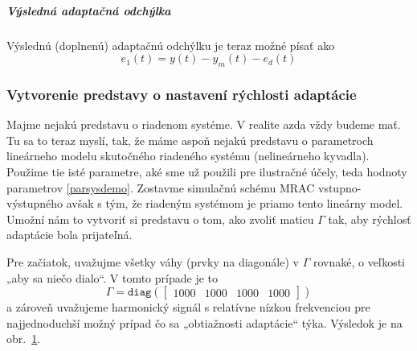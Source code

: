 \documentclass[a4paper, 10pt, ]{article}
\begin{document}
\subparagraph{Výsledná adaptačná odchýlka}

Výslednú (doplnenú) adaptačnú odchýlku je teraz možné písať ako
\begin{equation}
	e_1(t) = y(t) - y_m(t) - e_d(t)
\end{equation}















\subsubsection{Vytvorenie predstavy o nastavení rýchlosti adaptácie}

Majme nejakú predstavu o riadenom systéme. V realite azda vždy budeme mať. Tu sa to teraz myslí, tak, že máme aspoň nejakú predstavu o parametroch lineárneho modelu skutočného riadeného systému (nelineárneho kyvadla). Použime tie isté parametre, aké sme už použili pre ilustračné účely, teda hodnoty parametrov \eqref{parsysdemo}. Zostavme simulačnú schému MRAC vstupno-výstupného avšak s tým, že riadeným systémom je priamo tento lineárny model. Umožní nám to vytvoriť si predstavu o tom, ako zvoliť maticu $\Gamma$ tak, aby rýchlosť adaptácie bola prijateľná.

Pre začiatok, uvažujme všetky váhy (prvky na diagonále) v $\Gamma$ rovnaké, o veľkosti „aby sa niečo dialo“. V tomto prípade je to
\begin{equation*}
    \Gamma = \texttt{diag}
    \left(
    \begin{bmatrix}
        1000 & 1000 & 1000 & 1000
    \end{bmatrix}
    \right)
\end{equation*}
a zároveň uvažujeme harmonický signál s relatívne nízkou frekvenciou pre najjednoduchší možný prípad čo sa „obtiažnosti adaptácie“ týka. Výsledok je na obr.~\ref{figsc_ar06_kyvadlo_ep2_1}.



\begin{figure}[!t]
	\centering

    \vspace{-3mm}


    \vspace{-2mm}

	\caption{}
	\label{figsc_ar06_kyvadlo_ep2_1}


    \vspace{-2mm}

\end{figure}
\end{document}
